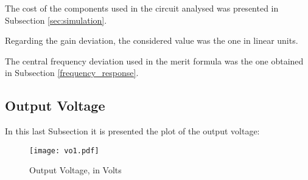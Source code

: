 \par The cost of the components used in the circuit analysed was presented in Subsection \ref{sec:simulation}.
\par Regarding the gain deviation, the considered value was the one in linear units.
\par The central frequency deviation used in the merit formula was the one obtained in Subsection \ref{frequency_response}.



\subsection{Output Voltage}
\label{outv}
In this last Subsection it is presented the plot of the output voltage:
\begin{figure}[H] \centering
\texttt{[image: vo1.pdf]}
\caption{Output Voltage, in Volts}
\label{fig:vo1}
\end{figure}
